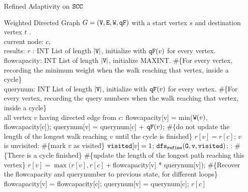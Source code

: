     \begin{algorithm}
        \caption{
        {Refined Adaptivity on $\mathtt{SCC}$}
        \label{alg:dfscycle_alg}
        }
        \begin{algorithmic}
        \REQUIRE Weighted Directed Graph $G = (\mathtt{V}, \mathtt{E}, \mathtt{W}, \mathtt{qF})$ with a start vertex $s$ and destination vertex $t$ .
        \\
        current node: $c$, 
        \\
        results: $r$ : INT List of length $|\mathtt{V}|$, initialize with $\mathtt{qF}(v)$ for every vertex.
        \\
        flowcapacity: INT List of length $|\mathtt{V}|$, initialize MAXINT. 
        \#\{For every vertex, recording the minimum weight when the walk reaching 
        that vertex, inside a cycle\}
        \\
        querynum: INT List of length $|\mathtt{V}|$, initialize with $\mathtt{qF}(v)$ for every vertex. 
        \#\{For every vertex, recording the query numbers when the walk reaching 
        that vertex, inside a cycle\}
        \\
          all vertex $v$ having directed edge from $c$:
        \STATE \qquad \qquad flowcapacity[v] = min($\mathtt{W}(v)$, flowcapacity[c]);
        \STATE \qquad \qquad querynum[v] = querynum[c] + $\mathtt{qF}(v)$;
        \STATE \qquad \qquad \#\{do not update the length of the longest walk reaching $v$ until the cycle is finished\}
        \STATE \qquad \qquad $r[v] =  r[c] $;
        \STATE {}  $v$ is unvisited:
        \STATE \qquad \qquad \#\{mark $v$ as visited\} $\mathtt{visited}[v] = 1$;
        \STATE \qquad \qquad $\mathtt{dfs_{refine}(G, v, visited)}$;
        \STATE {}: \#\{There is a cycle finished\}
        \STATE \qquad \qquad \#\{update the length of the longest path reaching this vertex\}
        \STATE \qquad \qquad 
         $r[v] =  \max(r[v], r[c] + $flowcapacity[v] * querynum[v]);
         \STATE \qquad \qquad \#\{Recover the flowcapacity and querynumber to previous state, for different loops\}
         \STATE \qquad \qquad flowcapacity[v] = flowcapacity[c];
         \STATE \qquad \qquad querynum[v] = querynum[c];
        \RETURN  $r[c]$
        \end{algorithmic}
        \end{algorithm}%
